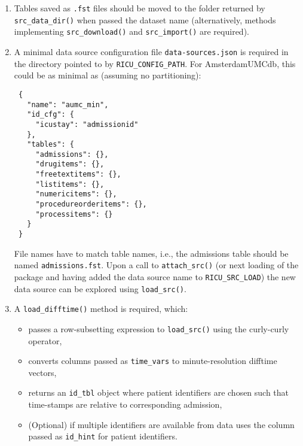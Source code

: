 \documentclass[
  notitle]{jss}
\providecommand{\tightlist}{%
  \setlength{\itemsep}{0pt}\setlength{\parskip}{0pt}}
\begin{document}
\begin{enumerate}
\def\labelenumi{\arabic{enumi}.}
\item
  Tables saved as \texttt{.fst} files should be moved to the folder
  returned by \texttt{src\_data\_dir()} when passed the dataset name
  (alternatively, methods implementing \texttt{src\_download()} and
  \texttt{src\_import()} are required).
\item
  A minimal data source configuration file \texttt{data-sources.json} is
  required in the directory pointed to by \texttt{RICU\_CONFIG\_PATH}.
  For AmsterdamUMCdb, this could be as minimal as (assuming no
  partitioning):

\begin{verbatim}
 {
   "name": "aumc_min",
   "id_cfg": {
     "icustay": "admissionid"
   },
   "tables": {
     "admissions": {},
     "drugitems": {},
     "freetextitems": {},
     "listitems": {},
     "numericitems": {},
     "procedureorderitems": {},
     "processitems": {}
   }
 }
\end{verbatim}

  File names have to match table names, i.e., the admissions table
  should be named \texttt{admissions.fst}. Upon a call to
  \texttt{attach\_src()} (or next loading of the package and having
  added the data source name to \texttt{RICU\_SRC\_LOAD}) the new data
  source can be explored using \texttt{load\_src()}.
\item
  A \texttt{load\_difftime()} method is required, which:

  \begin{itemize}
  \tightlist
  \item
    passes a row-subsetting expression to \texttt{load\_src()} using the
     curly-curly operator,
  \item
    converts columns passed as \texttt{time\_vars} to minute-resolution
    difftime vectors,
  \item
    returns an \texttt{id\_tbl} object where patient identifiers are
    chosen such that time-stamps are relative to corresponding
    admission,
  \item
    (Optional) if multiple identifiers are available from data uses the
    column passed as \texttt{id\_hint} for patient identifiers.
  \end{itemize}


\end{enumerate}
\end{document}

